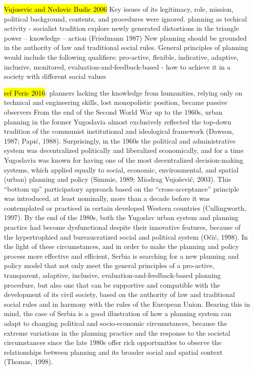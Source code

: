 \documentclass[11pt]{report}
\begin{document}
\hl{Vujosevic and Nedovic Budic 2006}
Key issues of its legitimacy, role, mission, political background, contents, and procedures were ignored.
planning as techical activity - socialist tradition
explore newly generated distortions in the triangle power – knowledge – action (Friedmann 1987)
New planning should be grounded in the authority of law and traditional social rules. 
General principles of planning would include the following qualifiers: pro-active, flexible, indicative, adaptive, inclusive, monitored, evaluation-and-feedback-based - how to achieve it in a society with different social values

\hl{ref Peric 2016}: 
planners lacking the knowledge from humanities, relying only on technical and engineering skills, lost monopolistic position, became passive observers
From the end of the Second World War up to the 1960s, urban planning in the former Yugoslavia almost exclusively reflected the top-down tradition of the communist institutional and ideological framework (Dawson, 1987; Papić, 1988). Surprisingly, in the 1960s the political and administrative system was decentralized politically and liberalized economically, and for a time Yugoslavia was known for having one of the most decentralized decision-making systems, which applied equally to social, economic, environmental, and spatial (urban) planning and policy (Simmie, 1989; Miodrag Vujošević, 2003). This “bottom up” participatory approach based on the “cross-acceptance” principle was introduced, at least nominally, more than a decade before it was contemplated or practiced in certain developed Western countries (Cullingworth, 1997). By the end of the 1980s, both the Yugoslav urban system and planning practice had become dysfunctional despite their innovative features, because of the hypertrophied and bureaucratized social and political system (Očić, 1998).
In the light of these circumstances, and in order to make the planning and policy process more effective and efficient, Serbia is searching for a new planning and policy model that not only meet the general principles of a pro-active, transparent, adaptive, inclusive, evaluation-and-feedback-based planning procedure, but also one that can be supportive and compatible with the development of its civil society, based on the authority of law and traditional social rules and in harmony with the rules of the European Union.
Bearing this in mind, the case of Serbia is a good illustration of how a planning system can adapt to changing political and socio-economic circumstances, because the extreme variations in the planning practice and the response to the societal circumstances since the late 1980s offer rich opportunities to observe the relationships between planning and its broader social and spatial context (Thomas, 1998).
\end{document}
